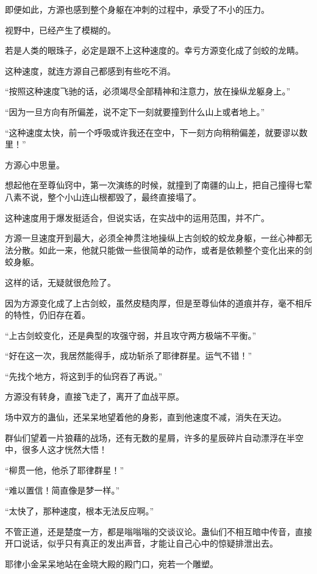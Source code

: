 \begin{this_body}
即便如此，方源也感到整个身躯在冲刺的过程中，承受了不小的压力。

视野中，已经产生了模糊的。

若是人类的眼珠子，必定是跟不上这种速度的。幸亏方源变化成了剑蛟的龙睛。

这种速度，就连方源自己都感到有些吃不消。

“按照这种速度飞驰的话，必须竭尽全部精神和注意力，放在操纵龙躯身上。”

“因为一旦方向有所偏差，说不定下一刻就要撞到什么山上或者地上。”

“这种速度太快，前一个呼吸或许我还在空中，下一刻方向稍稍偏差，就要谬以数里！”

方源心中思量。

想起他在至尊仙窍中，第一次演练的时候，就撞到了南疆的山上，把自己撞得七荤八素不说，整个小山连山根都毁了，最终直接塌了。

这种速度用于爆发挺适合，但说实话，在实战中的运用范围，并不广。

方源一旦速度开到最大，必须全神贯注地操纵上古剑蛟的蛟龙身躯，一丝心神都无法分散。如此一来，他就只能做一些很简单的动作，或者是依赖整个变化出来的剑蛟身躯。

这样的话，无疑就很危险了。

因为方源变化成了上古剑蛟，虽然皮糙肉厚，但是至尊仙体的道痕并存，毫不相斥的特性，仍旧存在着。

“上古剑蛟变化，还是典型的攻强守弱，并且攻守两方极端不平衡。”

“好在这一次，我居然能得手，成功斩杀了耶律群星。运气不错！”

“先找个地方，将这到手的仙窍吞了再说。”

方源没有转身，直接飞走了，离开了血战平原。

场中双方的蛊仙，还呆呆地望着他的身影，直到他速度不减，消失在天边。

群仙们望着一片狼藉的战场，还有无数的星屑，许多的星辰碎片自动漂浮在半空中，很多人这才恍然大悟！

“柳贯一他，他杀了耶律群星！”

“难以置信！简直像是梦一样。”

“太快了，那种速度，根本无法反应啊。”

不管正道，还是楚度一方，都是嗡嗡嗡的交谈议论。蛊仙们不相互暗中传音，直接开口说话，似乎只有真正的发出声音，才能让自己心中的惊疑排泄出去。

耶律小金呆呆地站在金晓大殿的殿门口，宛若一个雕塑。


\end{this_body}
